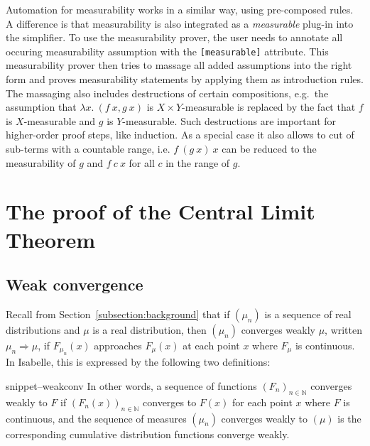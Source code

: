 \documentclass{svjour3}
\newcommand{\NN}{\mathbb{N}}
\newcommand{\Snippet}[1]{\csname snippet--#1\endcsname}
\begin{document}
Automation for measurability works in a similar way, using pre-composed rules. A difference is that measurability is also integrated as a \emph{measurable} plug-in into the simplifier. To use the measurability prover, the user needs to annotate all occuring measurability assumption with the \texttt{[measurable]} attribute. This measurability prover then tries to massage all added assumptions into the right form and proves measurability statements by applying them as introduction rules. The massaging also includes destructions of certain compositions, e.g.~the assumption that $\lambda x.~(f~x, g~x)$ is $X \times Y$-measurable is replaced by the fact that $f$ is $X$-measurable and $g$ is $Y$-measurable. Such destructions are important for higher-order proof steps, like induction. As a special case it also allows to cut of sub-terms with a countable range, i.e. $f~(g~x)~x$ can be reduced to the measurability of $g$ and $f~c~x$ for all $c$ in the range of $g$.

\section{The proof of the Central Limit Theorem}
\label{section:formal}

\subsection{Weak convergence}
\label{subsection:weak:convergence}

Recall from Section~\ref{subsection:background} that if $(\mu_n)$ is a sequence of real distributions and $\mu$ is a real distribution, then $(\mu_n)$ converges weakly $\mu$, written $\mu_n \Rightarrow \mu$, if $F_{\mu_n}(x)$ approaches $F_\mu(x)$ at each point $x$ where $F_\mu$ is continuous. In Isabelle, this is expressed by the following two definitions:

\Snippet{weakconv}
In other words, a sequence of functions $(F_n)_{n \in \NN}$ converges weakly to $F$ if $(F_n(x))_{n \in \NN}$ converges to $F(x)$ for each point $x$ where $F$ is continuous, and the sequence of measures $(\mu_n)$ converges weakly to $(\mu)$ is the corresponding cumulative distribution functions converge weakly.
\end{document}
